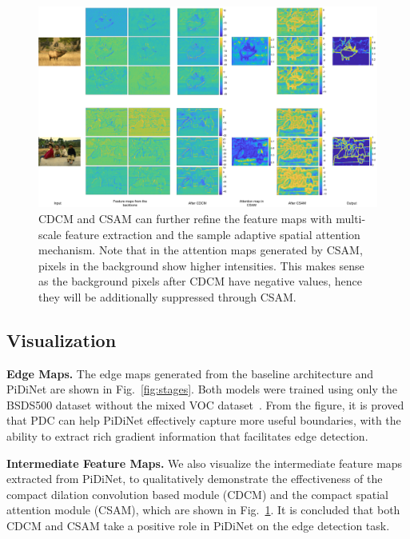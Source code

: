 \documentclass[10pt,twocolumn,letterpaper]{article}
\begin{document}
\begin{figure}[t!]
    \centering
    \includegraphics[width=1\linewidth]{images/supplement_fig_visual.pdf}
    \caption{CDCM and CSAM can further refine the feature maps with multi-scale feature extraction and the sample adaptive spatial attention mechanism. Note that in the attention maps generated by CSAM, pixels in the background show higher intensities. This makes sense as the background pixels after CDCM have negative values, hence they will be additionally suppressed through CSAM.}
    \label{fig:maps}
\end{figure}

\subsection{Visualization}

\vspace{0.3em}
\noindent  \textbf{Edge Maps.} \quad The edge maps generated from the baseline architecture and PiDiNet are shown in Fig.~\ref{fig:stages}. Both models were trained using only the BSDS500 dataset without the mixed VOC dataset~\cite{mottaghi2014voc}. From the figure, it is proved that PDC can help PiDiNet effectively capture more useful boundaries, with the ability to extract rich gradient information that facilitates edge detection. 

\vspace{0.3em}
\noindent  \textbf{Intermediate Feature Maps.} \quad We also visualize the intermediate feature maps extracted from PiDiNet, to qualitatively demonstrate the effectiveness of the compact dilation convolution based module (CDCM) and the compact spatial attention module (CSAM), which are shown in Fig.~\ref{fig:maps}. It is concluded that both CDCM and CSAM take a positive role in PiDiNet on the edge detection task.
\end{document}
